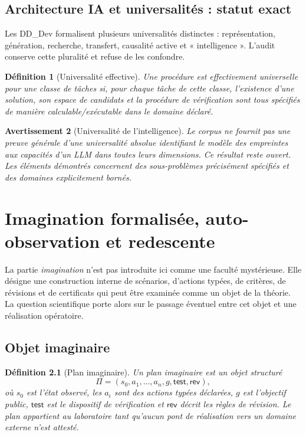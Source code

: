 \documentclass[11pt,a4paper,openany]{book}
\newtheorem{definition}{Définition}[chapter]
\newtheorem{warning}[definition]{Avertissement}
\begin{document}
\section{Architecture IA et universalités : statut exact}

Les DD\_Dev formalisent plusieurs universalités distinctes : représentation, génération, recherche, transfert, causalité active et « intelligence ». L'audit conserve cette pluralité et refuse de les confondre.

\begin{definition}[Universalité effective]
Une procédure est effectivement universelle pour une classe de tâches si, pour chaque tâche de cette classe, l'existence d'une solution, son espace de candidats et la procédure de vérification sont tous spécifiés de manière calculable/exécutable dans le domaine déclaré.
\end{definition}

\begin{warning}[Universalité de l'intelligence]
Le corpus ne fournit pas une preuve générale d'une universalité absolue identifiant le modèle des empreintes aux capacités d'un LLM dans toutes leurs dimensions. Ce résultat reste ouvert. Les éléments démontrés concernent des sous-problèmes précisément spécifiés et des domaines explicitement bornés.
\end{warning}

\chapter{Imagination formalisée, auto-observation et redescente}

La partie \emph{imagination} n'est pas introduite ici comme une faculté mystérieuse. Elle désigne une construction interne de scénarios, d'actions typées, de critères, de révisions et de certificats qui peut être examinée comme un objet de la théorie. La question scientifique porte alors sur le passage éventuel entre cet objet et une réalisation opératoire.

\section{Objet imaginaire}
\begin{definition}[Plan imaginaire]
Un plan imaginaire est un objet structuré
\[
\Pi=(s_0,a_1,\ldots,a_n,g,\mathsf{test},\mathsf{rev}),
\]
où $s_0$ est l'état observé, les $a_i$ sont des actions typées déclarées, $g$ est l'objectif public, $\mathsf{test}$ est le dispositif de vérification et $\mathsf{rev}$ décrit les règles de révision. Le plan appartient au laboratoire tant qu'aucun pont de réalisation vers un domaine externe n'est attesté.
\end{definition}
\end{document}
